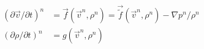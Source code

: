 \begin{subequations}\label{eq:poussins_ns}
\begin{align}
  \left(\partial\vec{v}/\partial{t}\right)^n &%
      = \vec{f}(\vec{v}^n, \rho^n)
      = \vec{\tilde{f}}(\vec{v}^n, \rho^n) - \nabla p^n / \rho^n
    \label{eq:poussins_ns_momentum}
    \\[1ex]
    \left(\partial\rho/\partial{t}\right)^n
      &= g(\vec{v}^n, \rho^n)
    \label{eq:poussins_ns_mass}
\end{align}
\end{subequations}
